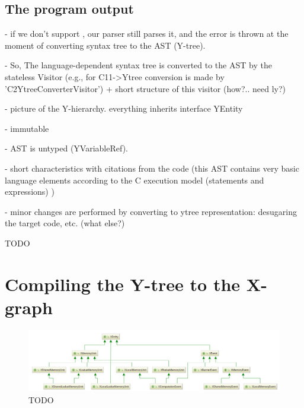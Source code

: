 \subsection{The program output}
\label{ch:impl:out}



- if we don't support , our parser still parses it, and the error is thrown at the moment of converting syntax tree to the AST (Y-tree).

- So, The language-dependent syntax tree is converted to the AST by the stateless Visitor (e.g., for C11->Ytree conversion is made by 'C2YtreeConverterVisitor') + short structure of this visitor (how?.. need ly?)



- picture of the Y-hierarchy. everything inherits interface YEntity

- immutable

- AST is untyped (YVariableRef).

- short characteristics with citations from the code (this AST contains very basic language elements according to the C execution model (statements and expressions) )

- minor changes are performed by converting to ytree representation: desugaring the target code, etc. (what else?)



TODO


\section{Compiling the Y-tree to the X-graph}
\label{ch:impl:y2x}


\begin{figure}%
  \centering
  \includegraphics[width=\textwidth,height=\textheight,keepaspectratio]{img/my/class-diagrams/XEntity.png}
  \caption{TODO}
  \label{fig:class-diagrams:XEntity}
\end{figure}

